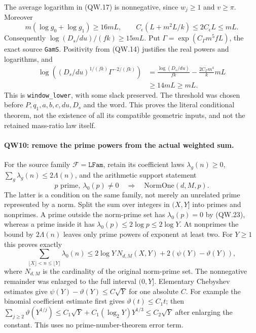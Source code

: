 The average logarithm in (QW.17) is nonnegative, since $w_j\ge1$ and
$v\ge\pi$. Moreover
\[
 m(\log g_0+\log g_1)\ge16mL,\qquad
 C_\epsilon(L+m^2L/k)\le2C_\epsilon L\le mL.
\]
Consequently $\log(D_s/du)/(fk)\ge15mL$. Put
$\Gamma=\exp(C_\Gamma m^5fL)$, the exact source \texttt{GamS}.
Positivity from (QW.14) justifies the real powers and logarithms, and
\[
 \begin{split}
 \log\!\left((D_s/du)^{1/(fk)}\Gamma^{-2/(fk)}\right)
 &=\frac{\log(D_s/du)}{fk}-\frac{2C_\Gamma m^4}{k}mL\\
 &\ge14mL\ge mL.
 \end{split}                                                    \tag{QW.22}
\]
This is \texttt{window\_lower}, with some slack preserved. The threshold
was chosen before $P,q_1,a,b,c,du,D_s$ and the word. This proves the
literal conditional theorem, not the existence of all its compatible
geometric inputs, and not the retained mass-ratio law itself.

\paragraph{QW10: remove the prime powers from the actual weighted sum.}
For the source family $\mathcal F=\texttt{LFam}$, retain its coefficient
laws $\lambda_g(n)\ge0$, $\sum_g\lambda_g(n)\le2\Lambda(n)$, and
the arithmetic support statement
\[
 p\text{ prime},\ \lambda_0(p)\ne0
                  \quad\Longrightarrow\quad\mathrm{NormOne}(d,M,p).
                                                                    \tag{QW.23}
\]
The latter is a condition on the same family, not merely an unrelated
prime represented by a norm. Split the sum over integers in $(X,Y]$
into primes and nonprimes. A prime outside the norm-prime set has
$\lambda_0(p)=0$ by (QW.23), whereas a prime inside it has
$\lambda_0(p)\le2\log p\le2\log Y$. At nonprimes the bound by
$2\Lambda(n)$ leaves only prime powers of exponent at least two.
For $Y\ge1$ this proves exactly
\[
 \sum_{\lfloor X\rfloor<n\le\lfloor Y\rfloor}\lambda_0(n)
 \le2\log Y\,N_{d,M}(X,Y)+2(\psi(Y)-\vartheta(Y)),               \tag{QW.24}
\]
where $N_{d,M}$ is the cardinality of the original norm-prime set.
The nonnegative remainder was enlarged to the full interval $(0,Y]$.
Elementary Chebyshev estimates give
$\psi(Y)-\vartheta(Y)\le C\sqrt Y$ for one absolute $C$.
For example the binomial coefficient estimate first gives
$\vartheta(t)\le C_1t$; then
$\sum_{j\ge2}\vartheta(Y^{1/j})\le C_1\sqrt Y+
C_1(\log_2Y)Y^{1/3}\le C_2\sqrt Y$ after enlarging the constant.
This uses no prime-number-theorem error term.

